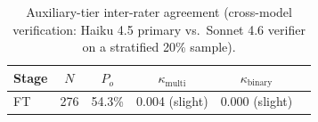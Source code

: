 \begin{table}[htbp]
\centering
\caption{Auxiliary-tier inter-rater agreement (cross-model verification: Haiku 4.5 primary vs.\ Sonnet 4.6 verifier on a stratified 20\% sample).}
\label{tab:aux-kappa-results}
\begin{tabular}{lccccc}
\toprule
Stage & $N$ & $P_o$ & $\kappa_{\text{multi}}$ & $\kappa_{\text{binary}}$ \\
\midrule
FT & 276 & 54.3\% & 0.004 (slight) & 0.000 (slight) \\
\bottomrule
\end{tabular}
\end{table}
